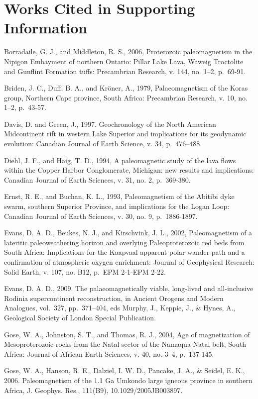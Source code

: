 \documentclass{article}
\begin{document}
    \section{Works Cited in Supporting
Information}\label{works-cited-in-supporting-information}

Borradaile, G. J., and Middleton, R. S., 2006, Proterozoic
paleomagnetism in the Nipigon Embayment of northern Ontario: Pillar Lake
Lava, Waweig Troctolite and Gunflint Formation tuffs: Precambrian
Research, v. 144, no. 1--2, p.~69-91.

Briden, J. C., Duff, B. A., and Kröner, A., 1979, Palaeomagnetism of the
Koras group, Northern Cape province, South Africa: Precambrian Research,
v. 10, no. 1--2, p.~43-57.

Davis, D. and Green, J., 1997. Geochronology of the North American
Midcontinent rift in western Lake Superior and implications for its
geodynamic evolution: Canadian Journal of Earth Science, v. 34,
p.~476--488.

Diehl, J. F., and Haig, T. D., 1994, A paleomagnetic study of the lava
flows within the Copper Harbor Conglomerate, Michigan: new results and
implications: Canadian Journal of Earth Sciences, v. 31, no. 2,
p.~369-380.

Ernst, R. E., and Buchan, K. L., 1993, Paleomagnetism of the Abitibi
dyke swarm, southern Superior Province, and implications for the Logan
Loop: Canadian Journal of Earth Sciences, v. 30, no. 9, p.~1886-1897.

Evans, D. A. D., Beukes, N. J., and Kirschvink, J. L., 2002,
Paleomagnetism of a lateritic paleoweathering horizon and overlying
Paleoproterozoic red beds from South Africa: Implications for the
Kaapvaal apparent polar wander path and a confirmation of atmospheric
oxygen enrichment: Journal of Geophysical Research: Solid Earth, v. 107,
no. B12, p.~EPM 2-1-EPM 2-22.

Evans, D. A. D., 2009. The palaeomagnetically viable, long-lived and
all-inclusive Rodinia supercontinent reconstruction, in Ancient Orogens
and Modern Analogues, vol.~327, pp.~371--404, eds Murphy, J., Keppie,
J., \& Hynes, A., Geological Society of London Special Publication.

Gose, W. A., Johnston, S. T., and Thomas, R. J., 2004, Age of
magnetization of Mesoproterozoic rocks from the Natal sector of the
Namaqua-Natal belt, South Africa: Journal of African Earth Sciences, v.
40, no. 3--4, p.~137-145.

Gose, W. A., Hanson, R. E., Dalziel, I. W. D., Pancake, J. A., \&
Seidel, E. K., 2006. Paleomagnetism of the 1.1 Ga Umkondo large igneous
province in southern Africa, J. Geophys. Res., 111(B9),
10.1029/2005JB003897.
\end{document}
